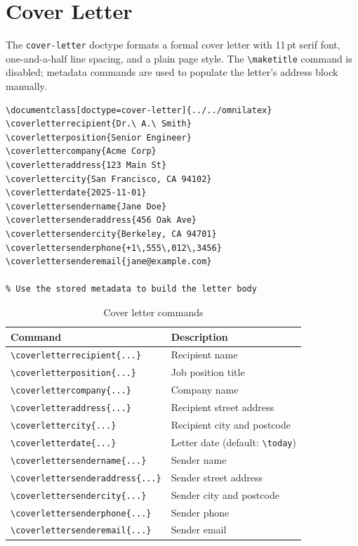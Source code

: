 \section{Cover Letter}
\label{sec:cover-letter}

The \texttt{cover-letter} doctype formats a formal cover letter with 11\,pt
serif font, one-and-a-half line spacing, and a plain page style.  The
\texttt{\textbackslash maketitle} command is disabled; metadata commands are
used to populate the letter's address block manually.

\begin{verbatim}
\documentclass[doctype=cover-letter]{../../omnilatex}
\coverletterrecipient{Dr.\ A.\ Smith}
\coverletterposition{Senior Engineer}
\coverlettercompany{Acme Corp}
\coverletteraddress{123 Main St}
\coverlettercity{San Francisco, CA 94102}
\coverletterdate{2025-11-01}
\coverlettersendername{Jane Doe}
\coverlettersenderaddress{456 Oak Ave}
\coverlettersendercity{Berkeley, CA 94701}
\coverlettersenderphone{+1\,555\,012\,3456}
\coverlettersenderemail{jane@example.com}

% Use the stored metadata to build the letter body

\end{verbatim}

\begin{table}[htbp]
    \centering
    \caption{Cover letter commands}
    \label{tab:cover-letter-commands}
    \begin{tabular}{@{} l p{7.5cm} @{}}
        \toprule
        \textbf{Command} & \textbf{Description} \\
        \midrule
        \texttt{\textbackslash coverletterrecipient\{...\}}  & Recipient name \\
        \texttt{\textbackslash coverletterposition\{...\}}   & Job position title \\
        \texttt{\textbackslash coverlettercompany\{...\}}    & Company name \\
        \texttt{\textbackslash coverletteraddress\{...\}}    & Recipient street address \\
        \texttt{\textbackslash coverlettercity\{...\}}       & Recipient city and postcode \\
        \texttt{\textbackslash coverletterdate\{...\}}       & Letter date (default: \texttt{\textbackslash today}) \\
        \texttt{\textbackslash coverlettersendername\{...\}} & Sender name \\
        \texttt{\textbackslash coverlettersenderaddress\{...\}} & Sender street address \\
        \texttt{\textbackslash coverlettersendercity\{...\}} & Sender city and postcode \\
        \texttt{\textbackslash coverlettersenderphone\{...\}} & Sender phone \\
        \texttt{\textbackslash coverlettersenderemail\{...\}} & Sender email \\
        \bottomrule
    \end{tabular}
\end{table}

